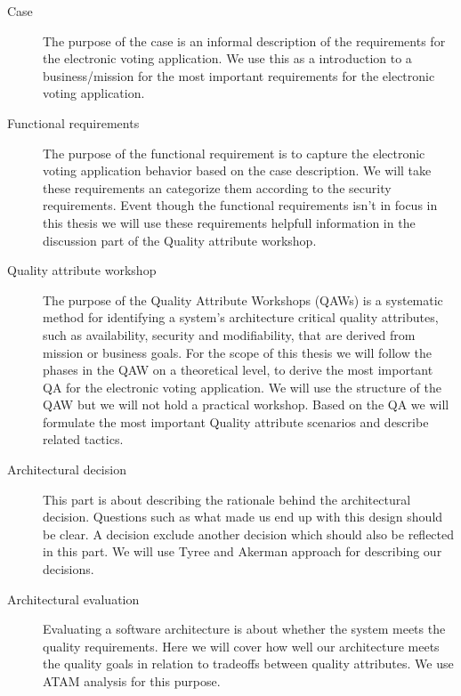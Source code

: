 \begin{description}
    \item[Case] The purpose of the case is an informal description of the requirements for the electronic voting application. We use this as a introduction to a business/mission for the most important requirements for the electronic voting application.
    
    
    \item[Functional requirements]  The purpose of the functional requirement is to capture the electronic voting application behavior based on the case description. We will take these requirements an categorize them according to the security requirements. Event though the functional requirements isn't in focus in this thesis we will use these requirements helpfull information in the discussion part of the Quality attribute workshop.  
    
    \item[Quality attribute workshop]  The purpose of the Quality Attribute Workshops (QAWs) is a systematic method for identifying a system's architecture critical quality attributes, such as availability, security and modifiability, that are derived from mission or business goals. For the scope of this thesis we will follow the phases in the QAW on a theoretical level, to derive the most important QA for the electronic voting application. We will use the structure of the QAW but we will not hold a practical workshop.  Based on the QA we will formulate the most important Quality attribute scenarios and describe related tactics.
    
    \item[Architectural decision]  This part is about describing the rationale behind the architectural decision. Questions such as what made us end up with this design should be clear. A decision exclude another decision which should also be reflected in this part. We will use Tyree and Akerman approach for describing our decisions. 
    
    \item[Architectural evaluation]  Evaluating a software architecture is about whether the system meets the quality requirements. Here we will cover how well our architecture meets the quality goals in relation to tradeoffs between quality attributes. We use ATAM analysis for this purpose.  

\end{description}